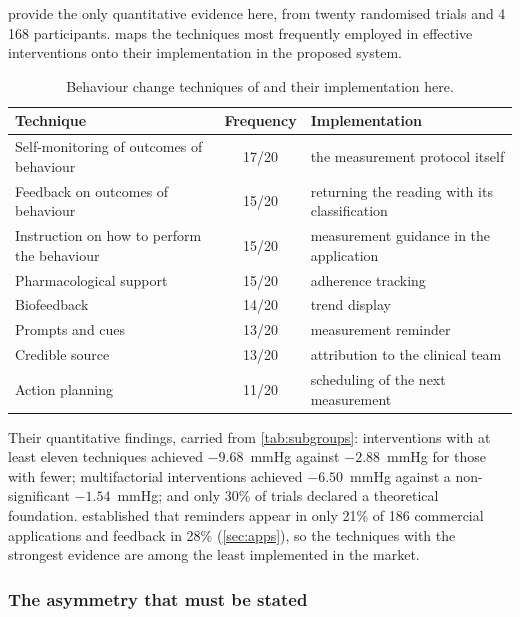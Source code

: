\documentclass[12pt,a4paper,oneside]{report}
\begin{document}
\Textcite{zhou2024} provide the only quantitative evidence here, from twenty randomised trials and 4\,168 participants.  maps the techniques most frequently employed in effective interventions onto their implementation in the proposed system.

\begin{table}[htbp]
\centering\small
\caption{Behaviour change techniques of \textcite{zhou2024} and their implementation here.}\label{tab:bct-implementation}
\begin{tabularx}{\textwidth}{@{}>{\raggedright\arraybackslash}p{5.4cm} c X@{}}
\toprule
\textbf{Technique} & \textbf{Frequency} & \textbf{Implementation} \\
\midrule
Self-monitoring of outcomes of behaviour & 17/20 & the measurement protocol itself \\
Feedback on outcomes of behaviour & 15/20 & returning the reading with its classification \\
Instruction on how to perform the behaviour & 15/20 & measurement guidance in the application \\
Pharmacological support & 15/20 & adherence tracking \\
Biofeedback & 14/20 & trend display \\
Prompts and cues & 13/20 & measurement reminder \\
Credible source & 13/20 & attribution to the clinical team \\
Action planning & 11/20 & scheduling of the next measurement \\
\bottomrule
\end{tabularx}
\end{table}

Their quantitative findings, carried from \cref{tab:subgroups}: interventions with at least eleven techniques achieved $-9.68$~mmHg against $-2.88$~mmHg for those with fewer; multifactorial interventions achieved $-6.50$~mmHg against a non-significant $-1.54$~mmHg; and only 30\% of trials declared a theoretical foundation. \Textcite{alessa2019} established that reminders appear in only 21\% of 186 commercial applications and feedback in 28\% (\cref{sec:apps}), so the techniques with the strongest evidence are among the least implemented in the market.

\subsubsection{The asymmetry that must be stated}
\end{document}
